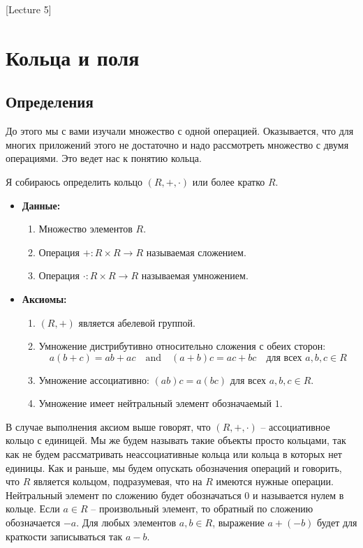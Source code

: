 [Lecture 5]


\section{Кольца и поля}

\subsection{Определения}

До этого мы с вами изучали множество с одной операцией.
Оказывается, что для многих приложений этого не достаточно и надо рассмотреть множество с двумя операциями.
Это ведет нас к понятию кольца.

\begin{definition}
Я собираюсь определить кольцо $(R, +, \cdot)$ или более кратко $R$.
\begin{itemize}
\item\textbf{Данные:} 
\begin{enumerate}
\item Множество элементов $R$.

\item Операция $+ \colon R\times R\to R$ называемая сложением.

\item Операция $\cdot \colon R\times R\to R$ называемая умножением.
\end{enumerate}

\item\textbf{Аксиомы:}
\begin{enumerate}
\item $(R, +)$ является абелевой группой.

\item Умножение дистрибутивно относительно сложения  с обеих сторон:
\[
a(b + c) = ab + ac \quad\text{and}\quad (a + b) c = ac + bc\quad \text{для всех }a, b, c\in R
\]

\item Умножение ассоциативно: $(ab)c = a(bc)$ для всех $a, b, c\in R$.

\item Умножение имеет нейтральный элемент обозначаемый $1$.
\end{enumerate}
\end{itemize}
В случае выполнения аксиом выше говорят, что $(R, +, \cdot)$ -- ассоциативное кольцо с единицей.
Мы же будем называть такие объекты просто кольцами, так как не будем рассматривать неассоциативные кольца или кольца в которых нет единицы.
Как и раньше, мы будем опускать обозначения операций и говорить, что $R$ является кольцом, подразумевая, что на $R$ имеются нужные операции.
Нейтральный элемент по сложению будет обозначаться $0$ и называется нулем в кольце.
Если $a\in R$ -- произвольный элемент, то обратный по сложению обозначается $-a$.
Для любых элементов $a, b\in R$, выражение $a + (-b)$ будет для краткости записываться так $a - b$.


\end{definition}

